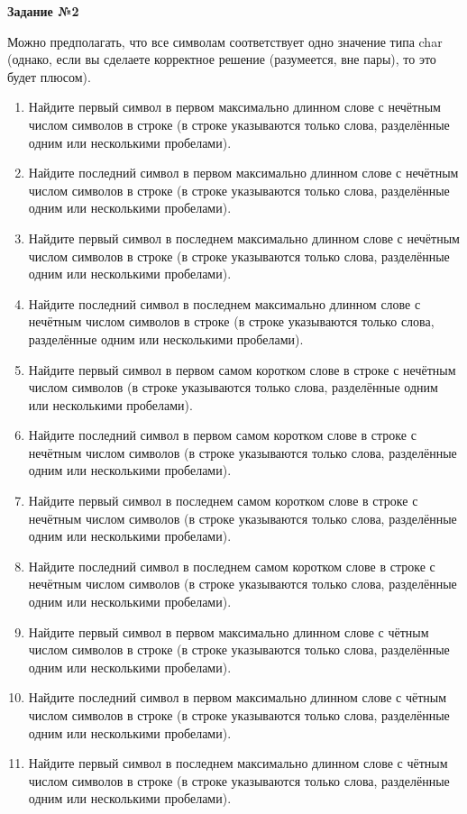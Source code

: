 \textbf{Задание №2}

Можно предполагать,
что все символам соответствует одно значение типа char (однако,
если вы сделаете корректное решение (разумеется, вне пары), то это будет плюсом).

\begin{enumerate}
\item Найдите первый символ в первом максимально длинном слове с нечётным числом символов в строке (в строке указываются только слова, разделённые одним или несколькими пробелами). 
\item Найдите последний символ в первом максимально длинном слове с нечётным числом символов в строке (в строке указываются только слова, разделённые одним или несколькими пробелами). 
\item Найдите первый символ в последнем максимально длинном слове с нечётным числом символов в строке (в строке указываются только слова, разделённые одним или несколькими пробелами). 
\item Найдите последний символ в последнем максимально длинном слове с нечётным числом символов в строке (в строке указываются только слова, разделённые одним или несколькими пробелами). 
\item Найдите первый символ в первом самом коротком слове в строке с нечётным числом символов (в строке указываются только слова, разделённые одним или несколькими пробелами). 
\item Найдите последний символ в первом самом коротком слове в строке с нечётным числом символов (в строке указываются только слова, разделённые одним или несколькими пробелами). 
\item Найдите первый символ в последнем самом коротком слове в строке с нечётным числом символов (в строке указываются только слова, разделённые одним или несколькими пробелами). 
\item Найдите последний символ в последнем самом коротком слове в строке с нечётным числом символов (в строке указываются только слова, разделённые одним или несколькими пробелами). 
\item Найдите первый символ в первом максимально длинном слове с чётным числом символов в строке (в строке указываются только слова, разделённые одним или несколькими пробелами). 
\item Найдите последний символ в первом максимально длинном слове с чётным числом символов в строке (в строке указываются только слова, разделённые одним или несколькими пробелами). 
\item Найдите первый символ в последнем максимально длинном слове с чётным числом символов в строке (в строке указываются только слова, разделённые одним или несколькими пробелами). 

\end{enumerate}

